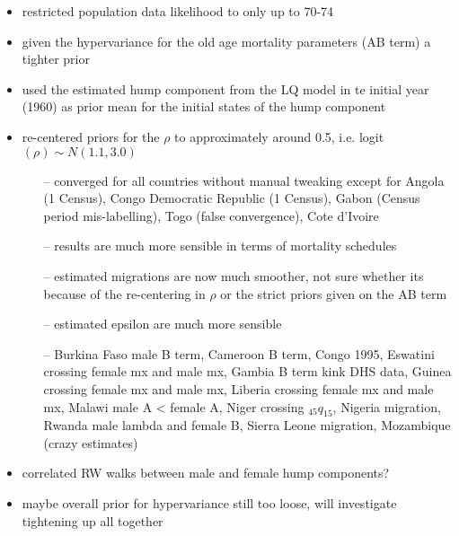 \documentclass[12pt,a4paper]{article}
\date{\vspace{-5ex}}
\begin{document}
\begin{itemize}
\item restricted population data likelihood to only up to 70-74
\item given the hypervariance for the old age mortality parameters (AB term) a tighter prior
\item used the estimated hump component from the LQ model in te initial year (1960) as prior mean for the initial states of the hump component
\item re-centered priors for the $\rho$ to approximately around 0.5, i.e. logit$(\rho) \sim N(1.1, 3.0)$
	\begin{itemize}
	\item[--] converged for all countries without manual tweaking except for Angola (1 Census), Congo Democratic Republic (1 Census), Gabon (Census period mis-labelling), Togo (false convergence), Cote d'Ivoire
	\item[--] results are much more sensible in terms of mortality schedules
	\item[--] estimated migrations are now much smoother, not sure whether its because of the re-centering in $\rho$ or the strict priors given on the AB term
	\item[--] estimated epsilon are much more sensible
	\item[--] Burkina Faso male B term, Cameroon B term, Congo 1995, Eswatini crossing female mx and male mx, Gambia B term kink DHS data, Guinea crossing female mx and male mx, Liberia crossing female mx and male mx, Malawi male A < female A,
	Niger crossing $_{45}q_{15}$, Nigeria migration, Rwanda male lambda and female B, Sierra Leone migration, Mozambique (crazy estimates)
	\end{itemize}

\item correlated RW walks between male and female hump components?
\item maybe overall prior for hypervariance still too loose, will investigate tightening up all together
\end{itemize}
\end{document}
